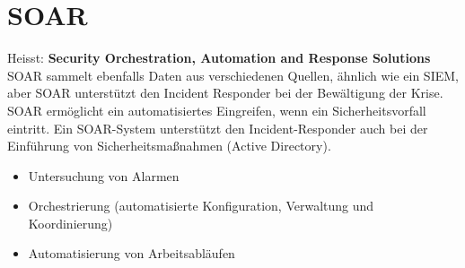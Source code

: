 \section{SOAR}
Heisst: \textbf{Security Orchestration, Automation and Response Solutions}\\

SOAR sammelt ebenfalls Daten aus verschiedenen Quellen, ähnlich wie ein SIEM, aber SOAR unterstützt den Incident Responder bei der Bewältigung der Krise.
SOAR ermöglicht ein automatisiertes Eingreifen, wenn ein Sicherheitsvorfall eintritt.
Ein SOAR-System unterstützt den Incident-Responder auch bei der Einführung von Sicherheitsmaßnahmen (Active Directory).
\begin{itemize}
  \item Untersuchung von Alarmen
  \item Orchestrierung (automatisierte Konfiguration, Verwaltung und Koordinierung)
  \item Automatisierung von Arbeitsabläufen
\end{itemize}